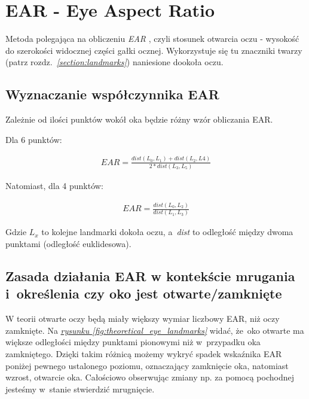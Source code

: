 \newpage

\section{EAR - Eye Aspect Ratio} \label{section:EARsection}

Metoda polegająca na obliczeniu \textit{EAR} \cite{EARRaspberryPi} \cite{eyeBlinkEARRosebrock}, czyli stosunek otwarcia oczu - wysokość do szerokości widocznej części gałki ocznej. Wykorzystuje się tu znaczniki twarzy (patrz rozdz.~\hyperref[{section:landmarks}]{\textit{\ref{section:landmarks}}}) naniesione dookoła oczu.

\subsection{Wyznaczanie współczynnika EAR}
Zależnie od ilości punktów wokół oka będzie różny wzór obliczania EAR.

\par

Dla 6 punktów:

\begin{align}
    EAR = \frac{dist(L_0, L_1) + dist(L_2, L4)}{2 * dist(L_3, L_5)}
\end{align}

Natomiast, dla 4 punktów:

\begin{align}
    EAR = \frac{dist(L_0, L_2)}{dist(L_1, L_3)}
\end{align}

Gdzie \textit{$L_x$} to kolejne landmarki dokoła oczu, a~\textit{dist} to odległość między dwoma punktami (odległość euklidesowa).


\subsection{Zasada działania EAR w kontekście mrugania i~określenia czy oko jest otwarte/zamknięte}

W teorii otwarte oczy będą miały większy wymiar liczbowy EAR, niż oczy zamknięte. Na \hyperref[{fig:theoretical_eye_landmarks}]{\textit{rysunku \ref{fig:theoretical_eye_landmarks}}} widać, że~oko otwarte ma większe odległości między punktami pionowymi niż w~przypadku oka zamkniętego. Dzięki takim różnicą możemy wykryć spadek wskaźnika EAR poniżej pewnego ustalonego poziomu, oznaczający zamknięcie oka, natomiast wzrost, otwarcie oka. Całościowo obserwując zmiany np. za pomocą pochodnej jesteśmy w~stanie stwierdzić mrugnięcie.


